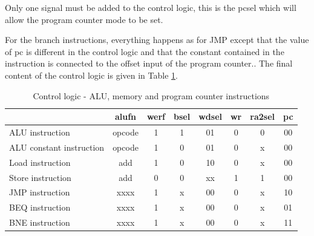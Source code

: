 Only one signal must be added to the control logic, this is the pcsel which will allow the program 
counter mode to be set.

For the branch instructions, everything happens as for JMP except that the value of pc is different 
in the control logic and that the constant contained in the instruction is connected to the offset 
input of the program counter.. The final content of the control logic is given in Table \ref{tab:cl/all}.

\begin{table}[H]
    \centering
    \begin{tabular}{|l|c|c|c|c|c|c|c|}
    \hline
    \rowcolor[HTML]{DAE8FC} 
    \multicolumn{1}{|c|}{\cellcolor[HTML]{DAE8FC}\textbf{Instruction}} & \textbf{alufn} & \textbf{werf} & \textbf{bsel} & \textbf{wdsel} & \textbf{wr} & \textbf{ra2sel} & \textbf{pc} \\ \hline
    ALU instruction                                                    & opcode         & 1             & 1             & 01             & 0           & 0               & 00          \\ \hline
    ALU constant instruction                                           & opcode         & 1             & 0             & 01             & 0           & x               & 00          \\ \hline
    Load instruction                                                   & add            & 1             & 0             & 10             & 0           & x               & 00          \\ \hline
    Store instruction                                                  & add            & 0             & 0             & xx             & 1           & 1               & 00          \\ \hline
    JMP instruction                                                    & xxxx           & 1             & x             & 00             & 0           & x               & 10          \\ \hline
    BEQ instruction                                                    & xxxx           & 1             & x             & 00             & 0           & x               & 01          \\ \hline
    BNE instruction                                                    & xxxx           & 1             & x             & 00             & 0           & x               & 11          \\ \hline
    \end{tabular}
    \caption{Control logic - ALU, memory and program counter instructions}
    \label{tab:cl/all}
\end{table}

